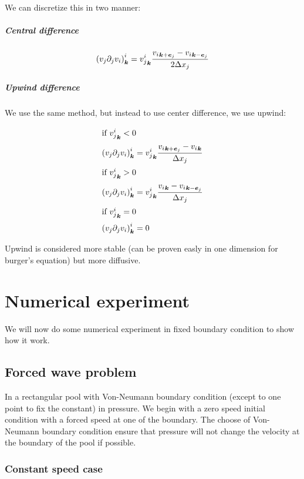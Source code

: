 We can discretize this in two manner:

\subparagraph{Central difference}
\begin{equation}
\left(v_{j}\partial_{j}v_{i}\right)^{i}_{{\boldsymbol {k}}}={v_{j}^{i}}_{{\boldsymbol {k}}}\frac{{v_{i}}_{{\boldsymbol {k}}+{\boldsymbol {e}}_j}-{v_{i}}_{{\boldsymbol {k}}-{\boldsymbol {e}}_j}}{2\Delta x_{j}}
\end{equation}

\subparagraph{Upwind difference}

We use the same method, but instead to use center difference, we use upwind:

\begin{align}
\intertext{if ${v_{j}^{i}}_{{\boldsymbol {k}}}<0$}
\left(v_{j}\partial_{j}v_{i}\right)^{i}_{{\boldsymbol {k}}}&={v_{j}^{i}}_{{\boldsymbol {k}}}\frac{{v_{i}}_{{\boldsymbol {k}}+{\boldsymbol {e}}_j}-{v_{i}}_{{\boldsymbol {k}}}}{\Delta x_{j}}\\
\intertext{if ${v_{j}^{i}}_{{\boldsymbol {k}}}>0$}
\left(v_{j}\partial_{j}v_{i}\right)^{i}_{{\boldsymbol {k}}}&={v_{j}^{i}}_{{\boldsymbol {k}}}\frac{{v_{i}}_{{\boldsymbol {k}}}-{v_{i}}_{{\boldsymbol {k}}-{\boldsymbol {e}}_j}}{\Delta x_{j}}\\
\intertext{if ${v_{j}^{i}}_{{\boldsymbol {k}}}=0$}
\left(v_{j}\partial_{j}v_{i}\right)^{i}_{{\boldsymbol {k}}}&=0
\end{align}

Upwind is considered more stable (can be proven easly in one dimension for burger's equation) but more diffusive.

\section{Numerical experiment}

We will now do some numerical experiment in fixed boundary condition to show how it work.

\subsection{Forced wave problem}

In a rectangular pool with Von-Neumann boundary condition (except to one point to fix the constant) in pressure.
We begin with a zero speed initial condition with a forced speed at one of the boundary.
The choose of Von-Neumann boundary condition ensure that pressure will not change the velocity at the boundary of the pool if possible.

\subsubsection{Constant speed case}

